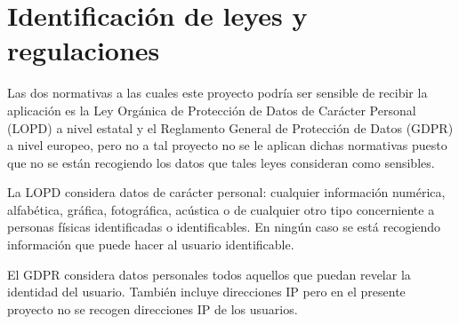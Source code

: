 \chapter{Identificación de leyes y regulaciones}

Las dos normativas a las cuales este proyecto podría ser sensible de recibir la aplicación es la Ley Orgánica de Protección de Datos de Carácter Personal (LOPD) a nivel estatal y el Reglamento General de Protección de Datos (GDPR) a nivel europeo, pero no a tal proyecto no se le aplican dichas normativas puesto que no se están recogiendo los datos que tales leyes consideran como sensibles.

La LOPD considera datos de carácter personal: cualquier información numérica, alfabética, gráfica, fotográfica, acústica o de cualquier otro tipo concerniente a personas físicas identificadas o identificables.
En ningún caso se está recogiendo información que puede hacer al usuario identificable.

El GDPR considera datos personales todos aquellos que puedan revelar la identidad del usuario. También incluye direcciones IP pero en el presente proyecto no se recogen direcciones IP de los usuarios.